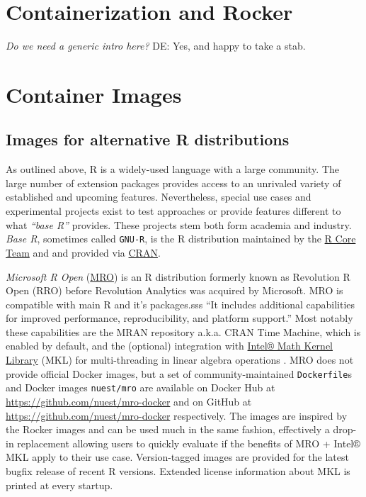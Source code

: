 \hypertarget{containerization-and-rocker}{%
\section{Containerization and
Rocker}\label{containerization-and-rocker}}

\emph{Do we need a generic intro here?} DE: Yes, and happy to take a
stab.

\hypertarget{container-images}{%
\section{Container Images}\label{container-images}}

\hypertarget{images-for-alternative-r-distributions}{%
\subsection{Images for alternative R
distributions}\label{images-for-alternative-r-distributions}}

As outlined above, R is a widely-used language with a large community.
The large number of extension packages provides access to an unrivaled
variety of established and upcoming features. Nevertheless, special use
cases and experimental projects exist to test approaches or provide
features different to what \emph{``base R''} provides. These projects
stem both form academia and industry. \emph{Base R}, sometimes called
\texttt{GNU-R}, is the R distribution maintained by the
\href{https://www.r-project.org/contributors.html}{R Core Team} and and
provided via \href{https://cran.r-project.org/}{CRAN}.

\emph{Microsoft R Open}
(\href{https://github.com/nuest/mro-docker}{MRO}) is an R distribution
formerly known as Revolution R Open (RRO) before Revolution Analytics
was acquired by Microsoft. MRO is compatible with main R and it's
packages.sss ``It includes additional capabilities for improved
performance, reproducibility, and platform support.''
\citep{microsoft_mro} Most notably these capabilities are the MRAN
repository a.k.a. CRAN Time Machine, which is enabled by default, and
the (optional) integration with
\href{https://software.intel.com/en-us/mkl}{Intel® Math Kernel Library}
(MKL) for multi-threading in linear algebra operations
\citep{microsoft_multithread}. MRO does not provide official Docker
images, but a set of community-maintained \texttt{Dockerfile}s and
Docker images \texttt{nuest/mro} are available on Docker Hub at
\url{https://github.com/nuest/mro-docker} and on GitHub at
\url{https://github.com/nuest/mro-docker} respectively. The images are
inspired by the Rocker images and can be used much in the same fashion,
effectively a drop-in replacement allowing users to quickly evaluate if
the benefits of MRO + Intel® MKL apply to their use case. Version-tagged
images are provided for the latest bugfix release of recent R versions.
Extended license information about MKL is printed at every startup.

